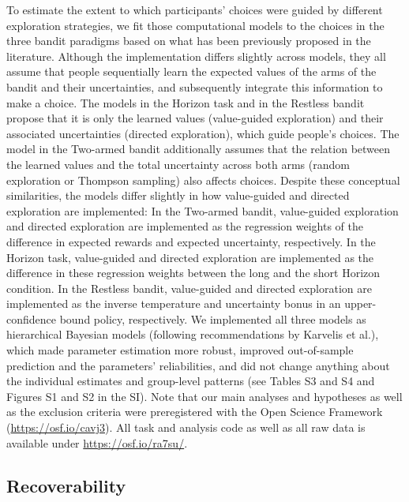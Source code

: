 \documentclass[fleqn,10pt]{wlscirep}
\begin{document}
To estimate the extent to which participants' choices were guided by different exploration strategies, we fit those computational models to the choices in the three bandit paradigms based on what has been previously proposed in the literature\cite{wilson_humans_2014, gershman_deconstructing_2018, speekenbrink_uncertainty_2015}. Although the implementation differs slightly across models, they all assume that people sequentially learn the expected values of the arms of the bandit and their uncertainties, and subsequently integrate this information to make a choice. The models in the Horizon task and in the Restless bandit propose that it is only the learned values (value-guided exploration) and their associated uncertainties (directed exploration), which guide people's choices. The model in the Two-armed bandit additionally assumes that the relation between the learned values and the total uncertainty across both arms (random exploration or Thompson sampling) also affects choices. Despite these conceptual similarities, the models differ slightly in how value-guided and directed exploration are implemented: In the Two-armed bandit, value-guided exploration and directed exploration are implemented as the regression weights of the difference in expected rewards and expected uncertainty, respectively. In the Horizon task, value-guided and directed exploration are implemented as the difference in these regression weights between the long and the short Horizon condition. In the Restless bandit, value-guided and directed exploration are implemented as the inverse temperature and uncertainty bonus in an upper-confidence bound policy, respectively. We implemented all three models as hierarchical Bayesian models (following recommendations by Karvelis et al.\cite{karvelis_individual_2023}), which made parameter estimation more robust, improved out-of-sample prediction and the parameters' reliabilities, and did not change anything about the individual estimates and group-level patterns (see Tables S3 and S4 and Figures S1 and S2 in the SI). Note that our main analyses and hypotheses as well as the exclusion criteria were preregistered with the Open Science Framework (\hyperlink{https://osf.io/cavj3}{https://osf.io/cavj3}). All task and analysis code as well as all raw data is available under \hyperlink{https://osf.io/ra7su/}{https://osf.io/ra7su/}.

\subsection*{Recoverability}
\end{document}
